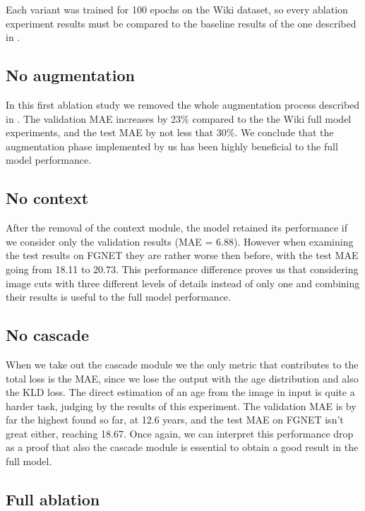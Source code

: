 Each variant was trained for 100 epochs on the Wiki dataset, so every ablation experiment
results must be compared to the baseline results of the one described in .

\subsection{No augmentation}
\label{subsec:no_augmentation}

In this first ablation study we removed the whole augmentation process described 
in . The validation MAE increases by 23\% compared to
the the Wiki full model experiments, and the test MAE by not less that 30\%. 
We conclude that the augmentation phase implemented by us has been highly beneficial 
to the full model performance.

\subsection{No context}
\label{subsec:no_context}

After the removal of the context module, the model retained its performance
if we consider only the validation results (MAE = 6.88). However when examining
the test results on FGNET they are rather worse then before, with the test MAE going 
from 18.11 to 20.73. This performance difference proves us that considering image cuts
with three different levels of details instead of only one and combining their results 
is useful to the full model performance.

\subsection{No cascade}
\label{subsec:no_cascade}

When we take out the cascade module we the only metric that contributes to the total loss is
the MAE, since we lose the output with the age distribution and also the KLD loss.
The direct estimation of an age from the image in input is quite a harder task, judging
by the results of this experiment.
The validation MAE is by far the highest found so far, at 12.6 years, and the test MAE on FGNET 
isn't great either, reaching 18.67. Once again, we can interpret this performance drop as a 
proof that also the cascade module is essential to obtain a good result in the full model.

\subsection{Full ablation}
\label{subsec:full_ablation}

